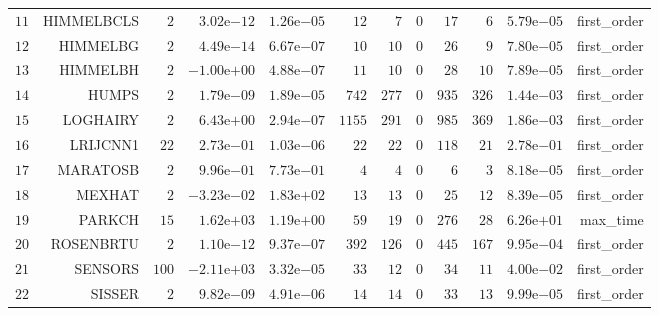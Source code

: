 \begin{longtable}{rrrrrrrrrrrr}
  \(    11\) & HIMMELBCLS & \(     2\) & \( 3.02\)e\(-12\) & \( 1.26\)e\(-05\) & \(    12\) & \(     7\) & \(     0\) & \(    17\) & \(     6\) & \( 5.79\)e\(-05\) & first\_order \\
  \(    12\) & HIMMELBG & \(     2\) & \( 4.49\)e\(-14\) & \( 6.67\)e\(-07\) & \(    10\) & \(    10\) & \(     0\) & \(    26\) & \(     9\) & \( 7.80\)e\(-05\) & first\_order \\
  \(    13\) & HIMMELBH & \(     2\) & \(-1.00\)e\(+00\) & \( 4.88\)e\(-07\) & \(    11\) & \(    10\) & \(     0\) & \(    28\) & \(    10\) & \( 7.89\)e\(-05\) & first\_order \\
  \(    14\) & HUMPS & \(     2\) & \( 1.79\)e\(-09\) & \( 1.89\)e\(-05\) & \(   742\) & \(   277\) & \(     0\) & \(   935\) & \(   326\) & \( 1.44\)e\(-03\) & first\_order \\
  \(    15\) & LOGHAIRY & \(     2\) & \( 6.43\)e\(+00\) & \( 2.94\)e\(-07\) & \(  1155\) & \(   291\) & \(     0\) & \(   985\) & \(   369\) & \( 1.86\)e\(-03\) & first\_order \\
  \(    16\) & LRIJCNN1 & \(    22\) & \( 2.73\)e\(-01\) & \( 1.03\)e\(-06\) & \(    22\) & \(    22\) & \(     0\) & \(   118\) & \(    21\) & \( 2.78\)e\(-01\) & first\_order \\
  \(    17\) & MARATOSB & \(     2\) & \( 9.96\)e\(-01\) & \( 7.73\)e\(-01\) & \(     4\) & \(     4\) & \(     0\) & \(     6\) & \(     3\) & \( 8.18\)e\(-05\) & first\_order \\
  \(    18\) & MEXHAT & \(     2\) & \(-3.23\)e\(-02\) & \( 1.83\)e\(+02\) & \(    13\) & \(    13\) & \(     0\) & \(    25\) & \(    12\) & \( 8.39\)e\(-05\) & first\_order \\
  \(    19\) & PARKCH & \(    15\) & \( 1.62\)e\(+03\) & \( 1.19\)e\(+00\) & \(    59\) & \(    19\) & \(     0\) & \(   276\) & \(    28\) & \( 6.26\)e\(+01\) & max\_time \\
  \(    20\) & ROSENBRTU & \(     2\) & \( 1.10\)e\(-12\) & \( 9.37\)e\(-07\) & \(   392\) & \(   126\) & \(     0\) & \(   445\) & \(   167\) & \( 9.95\)e\(-04\) & first\_order \\
  \(    21\) & SENSORS & \(   100\) & \(-2.11\)e\(+03\) & \( 3.32\)e\(-05\) & \(    33\) & \(    12\) & \(     0\) & \(    34\) & \(    11\) & \( 4.00\)e\(-02\) & first\_order \\
  \(    22\) & SISSER & \(     2\) & \( 9.82\)e\(-09\) & \( 4.91\)e\(-06\) & \(    14\) & \(    14\) & \(     0\) & \(    33\) & \(    13\) & \( 9.99\)e\(-05\) & first\_order \\

\end{longtable}
